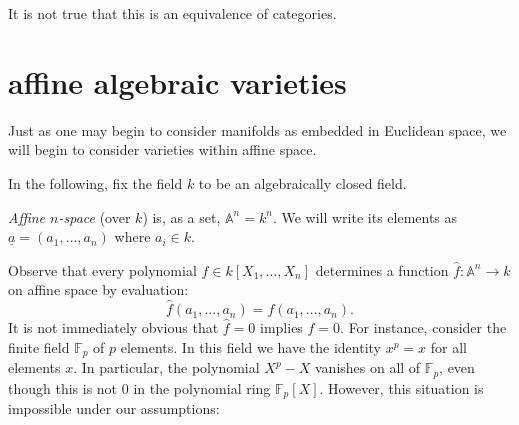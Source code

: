 \documentclass[12pt]{article}
\begin{document}
\begin{remark}
	It is not true that this is an equivalence of categories. 
\end{remark}


\section{affine algebraic varieties} %

Just as one may begin to consider manifolds as embedded in Euclidean space, we will begin to consider varieties within affine space.

In the following, fix the field $k$ to be an algebraically closed field.

\begin{definition}
	\emph{Affine $n$-space} (over $k$) is, as a set, $\mathbb{A}^n = k^n$. We will write its elements as $\underline{a}=(a_1,\dots, a_n)$ where $a_i\in k$.
\end{definition}

Observe that every polynomial $f\in k[X_1,\dots, X_n]$ determines a function $\hat{f}:\mathbb{A}^n\to k$ on affine space by evaluation:
\begin{equation*}
	\hat{f}(a_1,\dots, a_n) = f(a_1,\dots, a_n).
\end{equation*}
It is not immediately obvious that $\hat{f}=0$ implies $f=0$. For instance, consider the finite field $\mathbb{F}_p$ of $p$ elements. In this field we have the identity $x^p=x$ for all elements $x$. In particular, the polynomial $X^p-X$ vanishes on all of $\mathbb{F}_p$, even though this is not 0 in the polynomial ring $\mathbb{F}_p[X]$. However, this situation is impossible under our assumptions:
\end{document}
